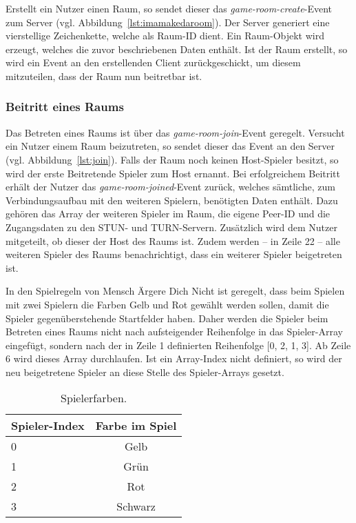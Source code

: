 Erstellt ein Nutzer einen Raum, so sendet dieser das \textit{game-room-create}-Event zum Server (vgl. Abbildung~\ref{lst:imamakedaroom}). Der Server generiert eine vierstellige Zeichenkette, welche als Raum-ID dient. Ein Raum-Objekt wird erzeugt, welches die zuvor beschriebenen Daten enthält. Ist der Raum erstellt, so wird ein Event an den erstellenden Client zurückgeschickt, um diesem mitzuteilen, dass der Raum nun beitretbar ist.\par

\subsubsection{Beitritt eines Raums}
Das Betreten eines Raums ist über das \textit{game-room-join}-Event geregelt. Versucht ein Nutzer einem Raum beizutreten, so sendet dieser das Event an den Server (vgl. Abbildung~\ref{lst:join}). Falls der Raum noch keinen Host-Spieler besitzt, so wird der erste Beitretende Spieler zum Host ernannt. Bei erfolgreichem Beitritt erhält der Nutzer das \textit{game-room-joined}-Event zurück, welches sämtliche, zum Verbindungsaufbau mit den weiteren Spielern, benötigten Daten enthält. Dazu gehören das Array der weiteren Spieler im Raum, die eigene Peer-ID und die Zugangsdaten zu den \acs{STUN}- und \acs{TURN}-Servern. Zusätzlich wird dem Nutzer mitgeteilt, ob dieser der Host des Raums ist. Zudem werden -- in Zeile 22 -- alle weiteren Spieler des Raums benachrichtigt, dass ein weiterer Spieler beigetreten ist.\par

In den Spielregeln von \glqq{}Mensch Ärgere Dich Nicht\grqq{} ist geregelt, dass beim Spielen mit zwei Spielern die Farben Gelb und Rot gewählt werden sollen, damit die Spieler gegenüberstehende Startfelder haben. Daher werden die Spieler beim Betreten eines Raums nicht nach aufsteigender Reihenfolge in das Spieler-Array eingefügt, sondern nach der in Zeile 1 definierten Reihenfolge [0, 2, 1, 3]. Ab Zeile 6 wird dieses Array durchlaufen. Ist ein Array-Index nicht definiert, so wird der neu beigetretene Spieler an diese Stelle des Spieler-Arrays gesetzt.\par

\begin{table}[ht]
\centering
\begin{tabular}[t]{lc}
\toprule
Spieler-Index&Farbe im Spiel\\
\midrule
0&Gelb\\
1&Grün\\
2&Rot\\
3&Schwarz\\
\bottomrule
\end{tabular}
\caption{Spielerfarben.}
\label{table:playercolors}
\end{table}


